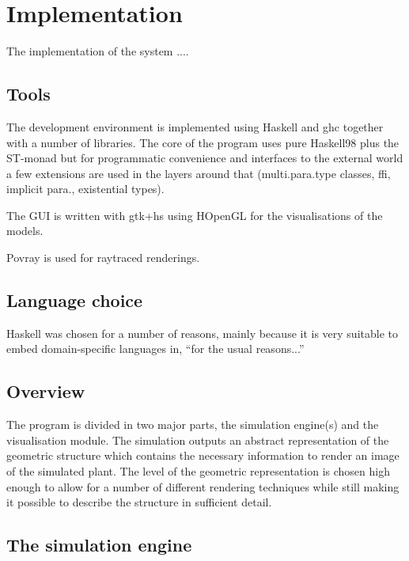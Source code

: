 


\section{Implementation}

    The implementation of the system ....


\subsection{Tools}
 
    The development environment is implemented using Haskell and ghc
    together with a number of libraries. The core of the program uses
    pure Haskell98 plus the ST-monad but for programmatic convenience
    and interfaces to the external world a few extensions are used in
    the layers around that (multi.para.type classes, ffi, implicit
    para., existential types). 

    The GUI is written with gtk+hs using HOpenGL for the
    visualisations of the models. 

    Povray is used for raytraced renderings.

\subsection{Language choice}

    Haskell was chosen for a number of reasons, mainly because it is
    very suitable to embed domain-specific languages in, ``for the
    usual reasons...'' 


\subsection{Overview}


    The program is divided in two major parts, the simulation
    engine(s) and the visualisation module. The simulation outputs an
    abstract representation of the geometric structure which contains
    the necessary information to render an image of the simulated
    plant. The level of the geometric representation is chosen high
    enough to allow for a number of different rendering techniques
    while still making it possible to describe the structure in
    sufficient detail.



\subsection{The simulation engine}

